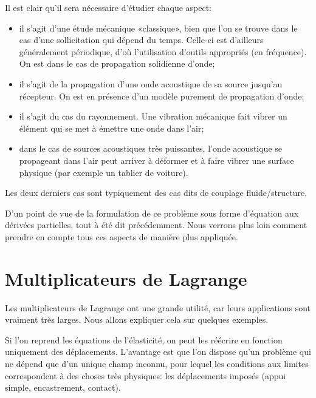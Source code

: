 \medskip
Il est clair qu'il sera nécessaire d'étudier chaque aspect:
\begin{itemize}
\item {} il s'agit d'une étude mécanique «classique», bien que l'on se trouve dans le cas d'une sollicitation qui dépend du temps. Celle-ci est d'ailleurs généralement périodique, d'où l'utilisation d'outils appropriés (en fréquence). On est dans le cas de propagation solidienne d'onde;
  \item {} il s'agit de la propagation d'une onde acoustique de sa source jusqu'au récepteur. On est en présence d'un modèle purement de propagation
	d'onde;
  \item {} il s'agit du cas du rayonnement. Une vibration mécanique fait vibrer un élément qui se met à émettre une onde dans l'air;
  \item {} dans le cas de sources acoustiques très puissantes, l'onde acoustique se propageant dans l'air peut arriver à déformer et à faire vibrer une surface physique (par exemple un tablier de voiture).
\end{itemize}
Les deux derniers cas sont typiquement des cas dits de couplage fluide/structure.

\medskip
D'un point de vue de la formulation de ce problème sous forme d'équation aux dérivées partielles, tout à été dit précédemment. Nous verrons plus loin comment prendre en compte tous ces aspects de manière plus appliquée.

\medskip
\section{Multiplicateurs de Lagrange}

Les multiplicateurs de Lagrange ont une grande utilité, car leurs applications sont
vraiment très larges.  Nous allons expliquer cela sur quelques exemples.

\medskip
Si l'on reprend les équations de l'élasticité, on peut les réécrire en fonction uniquement des déplacements. L'avantage est que l'on dispose qu'un problème qui ne dépend que d'un unique champ inconnu, pour lequel les conditions aux limites correspondent à des choses très physiques: les déplacements imposés (appui simple, encastrement, contact).

